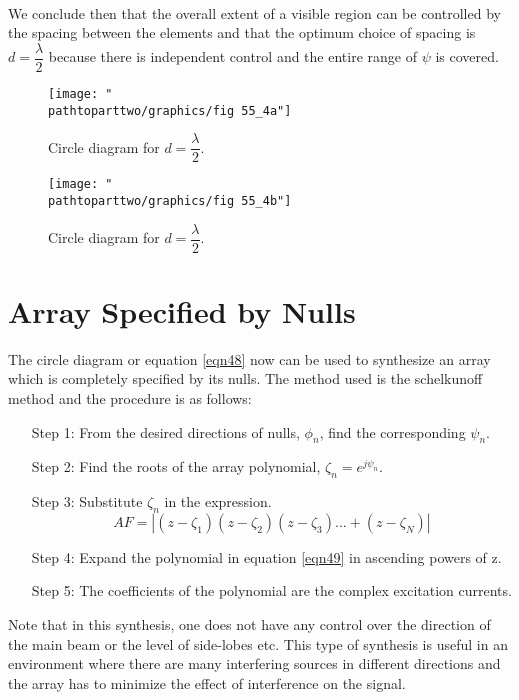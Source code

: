 \paragraph{}
We conclude then that the overall extent of a visible region can be controlled by the spacing between the elements and that the optimum choice of spacing is $d=\dfrac{\lambda}{2}$ because there is independent control and the entire range of $\psi$ is covered.
\begin{figure}[h]
\centering
\begin{minipage}[b]{0.4\textwidth}
\texttt{[image: "\\pathtoparttwo/graphics/fig 55\_4a"]}
\caption{Circle diagram for $d=\dfrac{\lambda}{2}$.}
\label{fig:fig-55_4a}
\end{minipage}
\hfill
\begin{minipage}[b]{0.4\textwidth}
\texttt{[image: "\\pathtoparttwo/graphics/fig 55\_4b"]}
\caption{Circle diagram for $d=\dfrac{\lambda}{2}$.}
\label{fig:fig-55_4a}
\end{minipage}
\end{figure}

\section{Array Specified by Nulls}
The circle diagram or equation \ref{eqn48} now can be used to synthesize an array which is completely specified by its nulls. The method used is the schelkunoff method and the procedure is as follows: 

\begin{enumerate}
\item[Step 1:] From the desired directions of nulls, $\phi_{n}$, find the corresponding $\psi_{n}$.
\item[Step 2:] Find the roots of the array polynomial, $\zeta
_n = e^{j\psi_{n}}$.
\item[Step 3:] Substitute $\zeta_n$ in the expression.
\begin{equation}
AF=|(z-\zeta_1)(z-\zeta_2)(z-\zeta_3)...+(z-\zeta_N)|
\label{eqn49}
\end{equation}
\item[Step 4:] Expand the polynomial in equation \ref{eqn49} in ascending powers of z.
\item[Step 5:] The coefficients of the polynomial are the complex excitation currents.
\end{enumerate}

Note that in this synthesis, one does not have any control over the direction of the main beam or the level of side-lobes etc. This type of synthesis is useful in an environment where there are many interfering sources in different directions and the array has to minimize the effect of interference on the signal.

